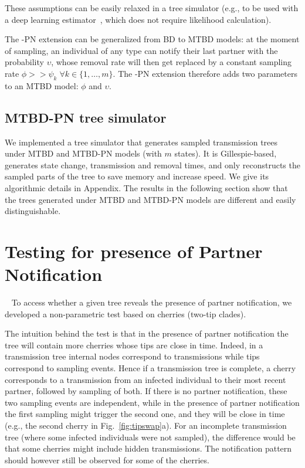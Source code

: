 \documentclass[a4paper,10pt]{article}
\begin{document}
These assumptions can be easily relaxed in a tree simulator (e.g., to be used with a deep learning estimator~\citep{Voznica2021}, which does not require likelihood calculation).


The -PN extension can be generalized from BD to MTBD models: at the moment of sampling, an individual of any type can notify their last partner with the probability $\upsilon$, whose removal rate will then get replaced by  a constant sampling rate $\phi >> \psi_k \; \forall k \in \{1, \ldots, m\}$. The -PN extension therefore adds two parameters to an MTBD model: $\phi$ and $\upsilon$.

\subsection{MTBD-PN tree simulator}

We implemented a tree simulator that generates sampled transmission trees under MTBD and MTBD-PN models (with $m$ states). It is Gillespie-based, generates state change, transmission and removal times, and only reconstructs the sampled parts of the tree to save memory and increase speed.
We give its algorithmic details in Appendix. The results in the following section show that the trees generated under MTBD and MTBD-PN models are different and easily distinguishable.



\section{Testing for presence of Partner Notification}~\label{sec:test}
To access whether a given tree reveals the presence of partner notification, we developed a non-parametric test based on cherries (two-tip clades). 

The intuition behind the test is that in the presence of partner notification the tree will contain more cherries whose tips are close in time. Indeed, in a transmission tree internal nodes correspond to transmissions while tips correspond to sampling events. Hence if a transmission tree is complete, a cherry corresponds to a transmission from an infected individual to their most recent partner, followed by sampling of both. If there is no partner notification, these two sampling events are independent, while in the presence of partner notification the first sampling might trigger the second one, and they will be close in time (e.g., the second cherry in Fig.~\ref{fig:tipswap}a). For an incomplete transmission tree (where some infected individuals were not sampled), the difference would be that some cherries might include hidden transmissions. The notification pattern should however still be observed for some of the cherries.
\end{document}

